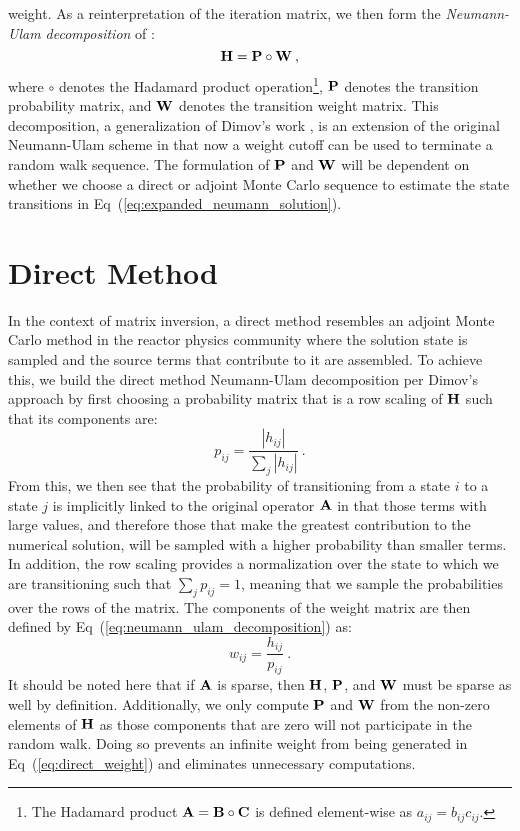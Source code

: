 weight. As a reinterpretation of the iteration matrix, we then form
the \textit{Neumann-Ulam decomposition} of :
\begin{equation}
  \mathbf{H} = \mathbf{P} \circ \mathbf{W}\:,
  \label{eq:neumann_ulam_decomposition}
\end{equation}
where $\circ$ denotes the Hadamard product operation\footnote{The
  Hadamard product $\mathbf{A} = \mathbf{B} \circ \mathbf{C}$ is defined
  element-wise as $a_{ij} = b_{ij} c_{ij}$.}, $\mathbf{P}$ denotes the
transition probability matrix, and $\mathbf{W}$ denotes the transition
weight matrix. This decomposition, a generalization of Dimov's work
\citep{dimov_new_1998}, is an extension of the original Neumann-Ulam
scheme in that now a weight cutoff can be used to terminate a random
walk sequence. The formulation of $\mathbf{P}$ and $\mathbf{W}$ will be
dependent on whether we choose a direct or adjoint Monte Carlo
sequence to estimate the state transitions in
Eq~(\ref{eq:expanded_neumann_solution}).

\section{Direct Method}
\label{sec:direct_mc}
In the context of matrix inversion, a direct method resembles an
adjoint Monte Carlo method in the reactor physics community where the
solution state is sampled and the source terms that contribute to it
are assembled. To achieve this, we build the direct method
Neumann-Ulam decomposition per Dimov's approach by first choosing a
probability matrix that is a row scaling of $\mathbf{H}$ such that its
components are:
\begin{equation}
  p_{ij} = \frac{|h_{ij}|}{\sum_j |h_{ij}|}\:.
  \label{eq:direct_probability}
\end{equation}
From this, we then see that the probability of transitioning from a
state $i$ to a state $j$ is implicitly linked to the original operator
$\mathbf{A}$ in that those terms with large values, and therefore those
that make the greatest contribution to the numerical solution, will be
sampled with a higher probability than smaller terms. In addition, the
row scaling provides a normalization over the state to which we are
transitioning such that $\sum_j p_{ij} = 1$, meaning that we sample
the probabilities over the rows of the matrix. The components of
the weight matrix are then defined by
Eq~(\ref{eq:neumann_ulam_decomposition}) as:
\begin{equation}
  w_{ij} = \frac{h_{ij}}{p_{ij}}\:.
  \label{eq:direct_weight}
\end{equation}
It should be noted here that if $\mathbf{A}$ is sparse, then $\mathbf{H}$,
$\mathbf{P}$, and $\mathbf{W}$ must be sparse as well by
definition. Additionally, we only compute $\mathbf{P}$ and $\mathbf{W}$ from
the non-zero elements of $\mathbf{H}$ as those components that are zero
will not participate in the random walk. Doing so prevents an
infinite weight from being generated in Eq~(\ref{eq:direct_weight})
and eliminates unnecessary computations.

